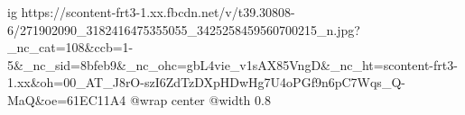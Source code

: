  
 
 
 
 

\ifcmt
  ig https://scontent-frt3-1.xx.fbcdn.net/v/t39.30808-6/271902090_3182416475355055_3425258459560700215_n.jpg?_nc_cat=108&ccb=1-5&_nc_sid=8bfeb9&_nc_ohc=gbL4vie_v1sAX85VngD&_nc_ht=scontent-frt3-1.xx&oh=00_AT_J8rO-szI6ZdTzDXpHDwHg7U4oPGf9n6pC7Wqs_Q-MaQ&oe=61EC11A4
	@wrap center
	@width 0.8
\fi
